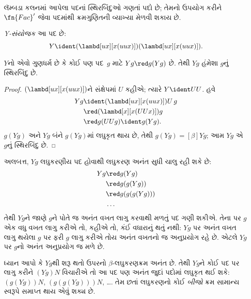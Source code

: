 \documentclass[../../../include/open-logic-section]{subfiles}
\begin{document}
લૅમ્બડા કલનમાં આપેલા પદનાં સ્થિરબિંદુઓ ગણતાં પદો છે;
તેમનો ઉપયોગ કરીને $\fn{Fac}'$ જેવા પદમાંથી ક્રમગુણિતની
વ્યાખ્યા મેળવી શકાય છે.

\begin{defn}
  \emph{Y-સંયોજક} આ પદ છે:
  \[
  Y \ident (\lambd[ux][x(uux)])(\lambd[ux][x(uux)]).
  \]
\end{defn}

\begin{thm}
  $Y$નો એવો ગુણધર્મ છે કે કોઈ પણ પદ~$g$ માટે
  $Yg \red g(Yg)$ છે. તેથી
  $Yg$ હંમેશા $g$નું સ્થિરબિંદુ છે.
\end{thm}

\begin{proof}
  $(\lambd[ux][x(uux)])$ને સંક્ષેપમાં $U$ કહીએ; ત્યારે
  $Y \ident UU$. હવે
  \begin{align*}
    Y g &\ident (\lambd[ux][x(uux)])U\,g \\
    &\red (\lambd[x][x(UUx)])g\\
    & \red g(UUg) \ident g(Yg).
  \end{align*}
  $g(Yg)$ અને $Yg$ બંને $g(Yg)$માં લઘુકૃત થાય છે,
  તેથી $g(Yg) \equal[\beta] Yg$; આમ $Yg$ એ $g$નું
  સ્થિરબિંદુ છે.
\end{proof}

અલબત્ત, $Yg$ લઘુકરણીય પદ હોવાથી લઘુકરણ અનંત સુધી
ચાલુ રહી શકે છે:
\begin{align*}
  Y g &\red g (Y g) \\
    &\red g (g (Y g)) \\
    &\red g(g (g (Y g)))\\
    &\ldots
\end{align*}
તેથી $Yg$ને જાણે $g$ને પોતે જ અનંત વખત લાગુ કરવાથી
મળતું પદ ગણી શકીએ. તેના પર $g$ એક વધુ વખત લાગુ
કરીએ તો, કહીએ તો, કંઈ વધારાનું થતું નથી: $Yg$ પર
અનંત વખત લાગુ થયેલા $g$ પર ફરી $g$ લાગુ કરીએ તોય
અનંત વખતનો જ અનુપ્રયોગ રહે છે. એટલે $Yg$ પર
$g$નો અનંત અનુપ્રયોગ જ મળે છે.

ધ્યાન આપો કે $Yg$થી શરૂ થતો ઉપરનો $\beta$-લઘુકરણક્રમ
અનંત છે. તેથી $Yg$ને કોઈ પદ પર લાગુ કરીને $(Yg)N$
વિચારીએ તો આ પદ પણ અનંત જુદાં પદોમાં લઘુકૃત થઈ શકે:
$(g(Yg))N$, $(g(g(Yg)))N$, \dots. તેમ છતાં લઘુકરણનો
કોઈ \emph{બીજો} ક્રમ સામાન્ય સ્વરૂપે સમાપ્ત થાય એવું શક્ય છે.
\end{document}
